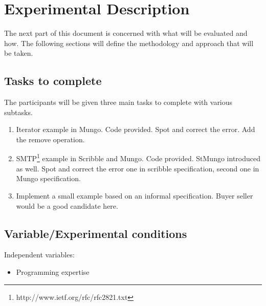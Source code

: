 \documentclass[11pt,notitlepage]{article}
\begin{document}
\section{Experimental Description}
The next part of this document is concerned with what will be evaluated and how.
The following sections will define the methodology and approach that will be taken.

\subsection{Tasks to complete}
The participants will be given three main tasks to complete with various subtasks.

\begin{enumerate}
  \item Iterator example in Mungo. Code provided. Spot and correct the error. Add the remove operation.
  \item SMTP\footnote{http://www.ietf.org/rfc/rfc2821.txt} example in Scribble and Mungo. Code provided. StMungo introduced as well. Spot and correct the error one in scribble specification, second one in Mungo specification.

  \item Implement a small example based on an informal specification. Buyer seller would be a good candidate here.
\end{enumerate}

\subsection{Variable/Experimental conditions}




Independent variables:
\begin{itemize}
  \item Programming expertise
\end{itemize}
\end{document}
